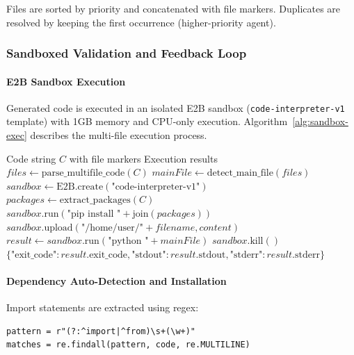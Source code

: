 Files are sorted by priority and concatenated with file markers. Duplicates are resolved by keeping the first occurrence (higher-priority agent).

\subsubsection{Sandboxed Validation and Feedback Loop}

\paragraph{E2B Sandbox Execution}
Generated code is executed in an isolated E2B sandbox (\texttt{code-interpreter-v1} template) with 1GB memory and CPU-only execution. Algorithm~\ref{alg:sandbox-exec} describes the multi-file execution process.

\begin{algorithm}
\caption{Sandboxed Multi-File Execution}
\label{alg:sandbox-exec}
\begin{algorithmic}[1]
\REQUIRE Code string \(C\) with file markers
\ENSURE Execution results
\STATE \(files \gets \text{parse\_multifile\_code}(C)\)
\STATE \(mainFile \gets \text{detect\_main\_file}(files)\) 
\STATE \(sandbox \gets \text{E2B.create}(\text{"code-interpreter-v1"})\)
\STATE \(packages \gets \text{extract\_packages}(C)\) 
\STATE \(sandbox.\text{run}(\text{"pip install "} + \text{join}(packages))\)
    \STATE \(sandbox.\text{upload}(\text{"/home/user/"} + filename, content)\)
\ENDFOR
\STATE \(result \gets sandbox.\text{run}(\text{"python "} + mainFile)\)
\STATE \(sandbox.\text{kill}()\)
\RETURN \(\{
    \text{"exit\_code"}: result.\text{exit\_code},
    \text{"stdout"}: result.\text{stdout},
    \text{"stderr"}: result.\text{stderr}
\}\)
\end{algorithmic}
\end{algorithm}

\paragraph{Dependency Auto-Detection and Installation}
Import statements are extracted using regex:

\begin{verbatim}
pattern = r"(?:^import|^from)\s+(\w+)"
matches = re.findall(pattern, code, re.MULTILINE)
\end{verbatim}

